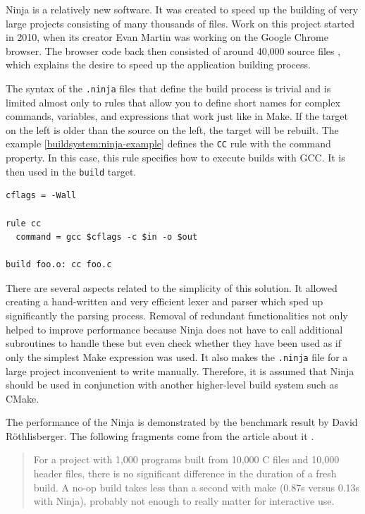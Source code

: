Ninja is a relatively new software. It was created to speed up the
building of very large projects consisting of many thousands of files.
Work on this project started in 2010, when its creator Evan Martin was
working on the Google Chrome browser. The browser code back then
consisted of around 40,000 source files \cite{NINJACHROME}, which explains the desire to
speed up the application building process.

The syntax of the \texttt{.ninja} files that define the build process is trivial
and is limited almost only to rules that allow you to define short names
for complex commands, variables, and expressions that work just like
in Make. If the target on the left is older than the source on the left,
the target will be rebuilt.
The example \ref{buildsystem:ninja-example} defines the \texttt{CC} rule with the command property.
In this case, this rule specifies how to execute builds with GCC.
It is then used in the \texttt{build} target.

\begin{lstlisting}[caption={Example of \texttt{.ninja}}, label={buildsystem:ninja-example}, caption={%
  Example of simple \texttt{.ninja} file \cite{NINJAFILE}%
}]
cflags = -Wall

rule cc
  command = gcc $cflags -c $in -o $out

build foo.o: cc foo.c
\end{lstlisting}

There are several aspects related to the simplicity of this solution. It
allowed creating a hand-written and very efficient lexer and parser
which sped up significantly the parsing process. Removal of redundant
functionalities not only helped to improve performance because Ninja does
not have to call additional subroutines to handle these but even check
whether they have been used as if only the simplest Make expression was
used. It also makes the \texttt{.ninja} file for a large project inconvenient to
write manually. Therefore, it is assumed that Ninja should be used in
conjunction with another higher-level build system such as CMake.

The performance of the Ninja is demonstrated by the benchmark result by
David Röthlisberger. The following fragments come from the article about it \cite{BENCHMARK}.

\begin{quote}
For a project with 1,000 programs built from 10,000 C files and 10,000
header files, there is no significant difference in the duration of a
fresh build. A no-op build takes less than a second with make (0.87s
versus 0.13s with Ninja), probably not enough to really matter for
interactive use.
\end{quote}

